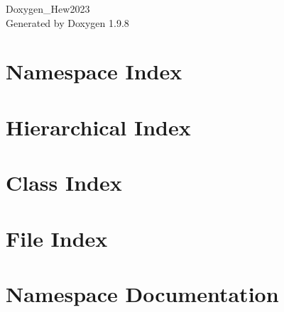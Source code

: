 \documentclass[twoside]{book}
\newcommand{\+}{\discretionary{\mbox{\scriptsize$\hookleftarrow$}}{}{}}
\newcommand{\clearemptydoublepage}{%
    \newpage{\pagestyle{empty}\cleardoublepage}%
  }
\begin{document}
  \raggedbottom
    \hypersetup{pageanchor=false,
                bookmarksnumbered=true,
                pdfencoding=unicode
               }
  \begin{titlepage}
  \vspace*{7cm}
  \begin{center}%
  {\Large Doxygen\+\_\+\+Hew2023}\\
  \vspace*{1cm}
  {\large Generated by Doxygen 1.9.8}\\
  \end{center}
  \end{titlepage}
  \clearemptydoublepage
  \tableofcontents
  \clearemptydoublepage
  \hypersetup{pageanchor=true}
\chapter{Namespace Index}

\chapter{Hierarchical Index}

\chapter{Class Index}

\chapter{File Index}

\chapter{Namespace Documentation}


\end{document}
